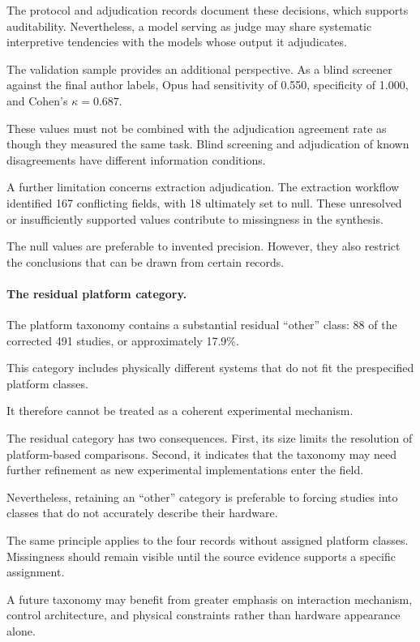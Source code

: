 The protocol
and adjudication
records document
these decisions,
which supports
auditability.
Nevertheless,
a model serving
as judge may
share systematic
interpretive tendencies
with the models
whose output
it adjudicates.

The validation
sample provides
an additional
perspective.
As a blind
screener against
the final
author labels,
Opus had
sensitivity
of 0.550,
specificity
of 1.000,
and Cohen's
$\kappa=0.687$.

These values
must not be
combined with
the adjudication
agreement rate
as though
they measured
the same task.
Blind screening
and adjudication
of known disagreements
have different
information conditions.

A further limitation
concerns extraction
adjudication.
The extraction
workflow identified
167 conflicting
fields, with
18 ultimately
set to null.
These unresolved
or insufficiently
supported values
contribute to
missingness in
the synthesis.

The null values
are preferable
to invented
precision.
However, they
also restrict
the conclusions
that can
be drawn
from certain
records.

\paragraph*{The residual platform category.}

The platform taxonomy contains
a substantial residual
``other'' class:
88 of the corrected
491 studies,
or approximately
17.9\%.

This category includes
physically different
systems that do
not fit the
prespecified
platform classes.

It therefore
cannot be treated
as a coherent
experimental mechanism.

The residual category
has two consequences.
First, its size
limits the
resolution of
platform-based
comparisons.
Second, it
indicates that
the taxonomy
may need
further refinement
as new experimental
implementations
enter the field.

Nevertheless,
retaining an
``other'' category
is preferable
to forcing
studies into
classes that
do not accurately
describe their
hardware.

The same principle
applies to
the four records
without assigned
platform classes.
Missingness
should remain
visible until
the source evidence
supports a
specific assignment.

A future taxonomy
may benefit from
greater emphasis
on interaction
mechanism,
control architecture,
and physical
constraints rather
than hardware
appearance alone.

